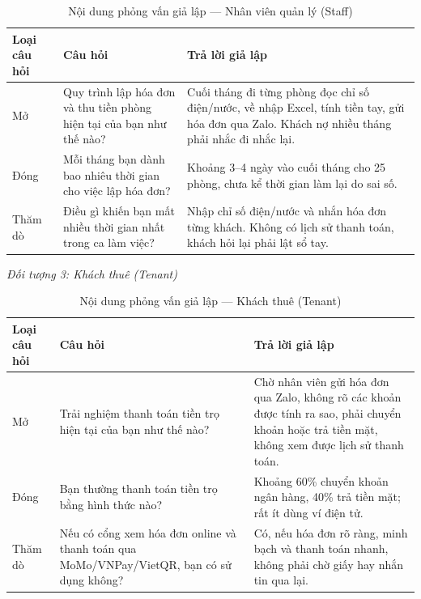 \documentclass[12pt,a4paper]{report}
\begin{document}
\begin{table}[H]
  \centering
  \caption{Nội dung phỏng vấn giả lập --- Nhân viên quản lý (Staff)}
  \label{tab:ig_int_staff}
  \begin{tabular}{@{}p{1.8cm}p{6cm}p{6.2cm}@{}}
    \toprule
    \textbf{Loại câu hỏi} & \textbf{Câu hỏi} & \textbf{Trả lời giả lập} \\
    \midrule
    Mở & Quy trình lập hóa đơn và thu tiền phòng hiện tại của bạn như thế nào? & Cuối tháng đi từng phòng đọc chỉ số điện/nước, về nhập Excel, tính tiền tay, gửi hóa đơn qua Zalo. Khách nợ nhiều tháng phải nhắc đi nhắc lại. \\
    \addlinespace
    Đóng & Mỗi tháng bạn dành bao nhiêu thời gian cho việc lập hóa đơn? & Khoảng 3--4 ngày vào cuối tháng cho 25 phòng, chưa kể thời gian làm lại do sai số. \\
    \addlinespace
    Thăm dò & Điều gì khiến bạn mất nhiều thời gian nhất trong ca làm việc? & Nhập chỉ số điện/nước và nhắn hóa đơn từng khách. Không có lịch sử thanh toán, khách hỏi lại phải lật sổ tay. \\
    \bottomrule
  \end{tabular}
\end{table}

\noindent\textit{Đối tượng 3: Khách thuê (Tenant)}

\begin{table}[H]
  \centering
  \caption{Nội dung phỏng vấn giả lập --- Khách thuê (Tenant)}
  \label{tab:ig_int_tenant}
  \begin{tabular}{@{}p{1.8cm}p{6cm}p{6.2cm}@{}}
    \toprule
    \textbf{Loại câu hỏi} & \textbf{Câu hỏi} & \textbf{Trả lời giả lập} \\
    \midrule
    Mở & Trải nghiệm thanh toán tiền trọ hiện tại của bạn như thế nào? & Chờ nhân viên gửi hóa đơn qua Zalo, không rõ các khoản được tính ra sao, phải chuyển khoản hoặc trả tiền mặt, không xem được lịch sử thanh toán. \\
    \addlinespace
    Đóng & Bạn thường thanh toán tiền trọ bằng hình thức nào? & Khoảng 60\% chuyển khoản ngân hàng, 40\% trả tiền mặt; rất ít dùng ví điện tử. \\
    \addlinespace
    Thăm dò & Nếu có cổng xem hóa đơn online và thanh toán qua MoMo/VNPay/VietQR, bạn có sử dụng không? & Có, nếu hóa đơn rõ ràng, minh bạch và thanh toán nhanh, không phải chờ giấy hay nhắn tin qua lại. \\
    \bottomrule
  \end{tabular}
\end{table}
\end{document}
